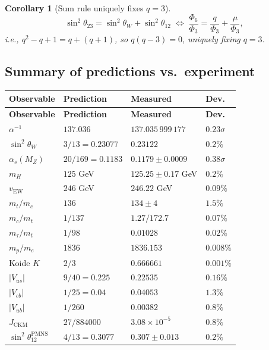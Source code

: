 \documentclass[12pt,a4paper]{article}
\newtheorem{corollary}[theorem]{Corollary}
\theoremstyle{definition}
\newcommand{\Phithree}{\Phi_3}
\newcommand{\Phisix}{\Phi_6}
\begin{document}
\begin{corollary}[Sum rule uniquely fixes $q=3$]
\begin{equation}
  \sin^2\theta_{23} = \sin^2\theta_W + \sin^2\theta_{12}
  \;\Longleftrightarrow\;
  \frac{\Phisix}{\Phithree} = \frac{q}{\Phithree}+\frac{\mu}{\Phithree},
\end{equation}
i.e., $q^2-q+1 = q+(q+1)$, so $q(q-3)=0$, uniquely fixing $q=3$.
\end{corollary}

\subsection{Summary of predictions vs.\ experiment}

\begin{center}
\small
\begin{longtable}{@{}llll@{}}
\toprule
\textbf{Observable} & \textbf{Prediction} & \textbf{Measured} & \textbf{Dev.} \\
\midrule
\endfirsthead
\toprule
\textbf{Observable} & \textbf{Prediction} & \textbf{Measured} & \textbf{Dev.} \\
\midrule
\endhead
\bottomrule
\endfoot
$\alpha^{-1}$  & $137.036$ & $137.035\,999\,177$ & $0.23\sigma$ \\
$\sin^2\theta_W$ & $3/13=0.23077$ & $0.23122$ & $0.2\%$ \\
$\alpha_s(M_Z)$ & $20/169=0.1183$ & $0.1179\pm 0.0009$ & $0.38\sigma$ \\
$m_H$ & $125$ GeV & $125.25\pm 0.17$ GeV & $0.2\%$ \\
$v_{\text{EW}}$ & $246$ GeV & $246.22$ GeV & $0.09\%$ \\
$m_t/m_c$ & $136$ & $134\pm 4$ & $1.5\%$ \\
$m_c/m_t$ & $1/137$ & $1.27/172.7$ & $0.07\%$ \\
$m_\tau/m_t$ & $1/98$ & $0.01028$ & $0.02\%$ \\
$m_p/m_e$ & $1836$ & $1836.153$ & $0.008\%$ \\
Koide $K$ & $2/3$ & $0.666661$ & $0.001\%$ \\
$|V_{us}|$ & $9/40=0.225$ & $0.22535$ & $0.16\%$ \\
$|V_{cb}|$ & $1/25=0.04$ & $0.04053$ & $1.3\%$ \\
$|V_{ub}|$ & $1/260$ & $0.00382$ & $0.8\%$ \\
$J_{\text{CKM}}$ & $27/884000$ & $3.08\times 10^{-5}$ & $0.8\%$ \\
$\sin^2\theta_{12}^{\text{PMNS}}$ & $4/13=0.3077$ & $0.307\pm 0.013$ & $0.2\%$ \\

\end{longtable}
\end{center}
\end{document}
